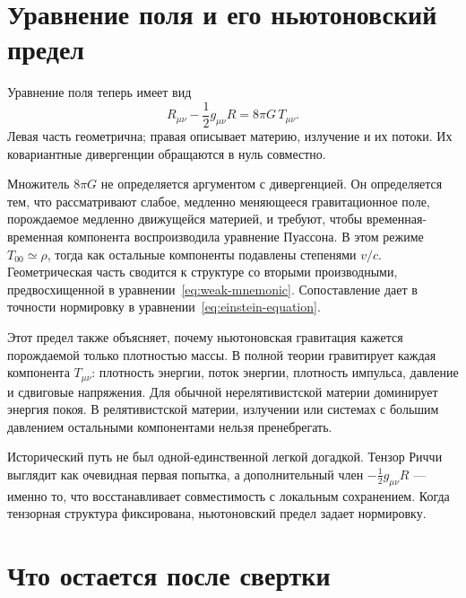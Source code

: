 \section{Уравнение поля и его ньютоновский предел}

Уравнение поля теперь имеет вид
\begin{equation}
 \boxed{
 R_{\mu\nu}-\frac12 g_{\mu\nu}R
 =
 8\pi G\,T_{\mu\nu}
 }.
 \label{eq:einstein-equation}
\end{equation}
Левая часть геометрична; правая описывает материю, излучение и их потоки. Их ковариантные дивергенции обращаются в нуль совместно.

Множитель \(8\pi G\) не определяется аргументом с дивергенцией. Он определяется тем, что рассматривают слабое, медленно меняющееся гравитационное поле, порождаемое медленно движущейся материей, и требуют, чтобы временная-временная компонента воспроизводила уравнение Пуассона. В этом режиме \(T_{00}\simeq\rho\), тогда как остальные компоненты подавлены степенями \(v/c\). Геометрическая часть сводится к структуре со вторыми производными, предвосхищенной в уравнении~\eqref{eq:weak-mnemonic}. Сопоставление дает в точности нормировку в уравнении~\eqref{eq:einstein-equation}.

Этот предел также объясняет, почему ньютоновская гравитация кажется порождаемой только плотностью массы. В полной теории гравитирует каждая компонента \(T_{\mu\nu}\): плотность энергии, поток энергии, плотность импульса, давление и сдвиговые напряжения. Для обычной нерелятивистской материи доминирует энергия покоя. В релятивистской материи, излучении или системах с большим давлением остальными компонентами нельзя пренебрегать.

Исторический путь не был одной-единственной легкой догадкой. Тензор Риччи выглядит как очевидная первая попытка, а дополнительный член \(-\tfrac12g_{\mu\nu}R\) — именно то, что восстанавливает совместимость с локальным сохранением. Когда тензорная структура фиксирована, ньютоновский предел задает нормировку.

\section{Что остается после свертки}

\begin{classroomqa}
\end{classroomqa}

